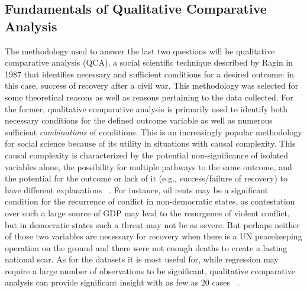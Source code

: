 \documentclass{article}
\begin{document}
\subsection{Fundamentals of Qualitative Comparative Analysis}
The methodology used to answer the last two questions will be qualitative comparative analysis (QCA), a social scientific technique described by Ragin in 1987 that identifies necessary and sufficient conditions for a desired outcome: in this case, success of recovery after a civil war. This methodology was selected for some theoretical reasons as well as reasons pertaining to the data collected. For the former, qualitative comparative analysis is primarily used to identify both necessary conditions for the defined outcome variable as well as numerous sufficient \textit{combinations} of conditions. This is an increasingly popular methodology for social science because of its utility in situations with causal complexity. This causal complexity is characterized by the potential non-significance of isolated variables alone, the possibility for multiple pathways to the same outcome, and the potential for the outcome or lack of it (e.g., success/failure of recovery) to have different explanations ~\cite{mello}. For instance, oil rents may be a significant condition for the recurrence of conflict in non-democratic states, as contestation over such a large source of GDP may lead to the resurgence of violent conflict, but in democratic states such a threat may not be as severe. But perhaps neither of those two variables are necessary for recovery when there is a UN peacekeeping operation on the ground and there were not enough deaths to create a lasting national scar. As for the datasets it is most useful for, while regression may require a large number of observations to be significant, qualitative comparative analysis can provide significant insight with as few as 20 cases ~\cite{mello}. 
\end{document}

